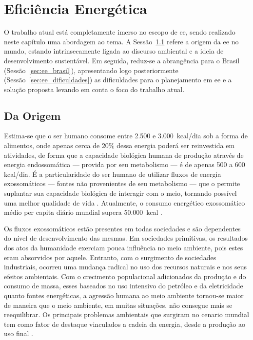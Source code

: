 \chapter{Eficiência Energética}
\label{chap:ee}
\glsresetall

O trabalho atual está completamente imerso no escopo de \gls{ee},
sendo realizado neste capítulo uma abordagem ao tema. 
A Sessão~\ref{sec:ee_origem} refere a origem da \gls{ee} no mundo, estando
intrinsecamente ligada ao discurso ambiental e a ideia de desenvolvimento
sustentável. Em seguida, reduz-se a abrangência para o Brasil
(Sessão~\ref{sec:ee_brasil}), apresentando logo posteriormente
(Sessão~\ref{sec:ee_dificuldades}) as dificuldades para o planejamento em \gls{ee} 
e a solução proposta levando em conta o foco do trabalho atual.

\section{Da Origem}
\label{sec:ee_origem}

Estima-se que o ser humano consome entre 2.500 e 3.000~\acrshort{kcal}/dia sob a 
forma de alimentos, onde apenas cerca de 20\% dessa energia poderá ser 
reinvestida em atividades, de forma que a capacidade biológica humana de produção
através de energia endossomática --- provida por seu metabolismo --- é de 
apenas 500 a 600 \acrshort{kcal}/dia. É a particularidade do ser humano de
utilizar fluxos de energia exossomáticos --- fontes não provenientes de seu metabolismo 
--- que o permite suplantar sua capacidade biológica de interagir com o meio,
tornando possível uma melhor qualidade de vida \cite{rippel}. 
Atualmente, o consumo energético exossomático médio per capita diário 
mundial supera 50.000~\acrshort{kcal} \cite{world_statics_2012}.

Os fluxos exossomáticos estão presentes em todas sociedades e são dependentes do
nível de desenvolvimento das mesmas. Em sociedades primitivas, os resultados dos
atos da humanidade exerciam pouca influência no meio ambiente, pois estes eram
absorvidos por aquele. Entranto, com o surgimento de sociedades industriais,
ocorreu uma mudança radical no uso dos recursos naturais e nos seus efeitos
ambientais. Com o crecimento populacional adicionados da produção e do consumo 
de massa, esses baseados no uso intensivo do petróleo e da eletricidade quanto 
fontes energéticas, a agressão humana ao meio ambiente tornou-se maior de maneira 
que o meio ambiente, em muitas situações, não consegue mais se reequilibrar. 
Os principais problemas ambientais que surgiram no cenario mundial tem 
como fator de destaque vinculados a cadeia da energia, 
desde a produção ao uso final \cite{rippel,jatoba}.

